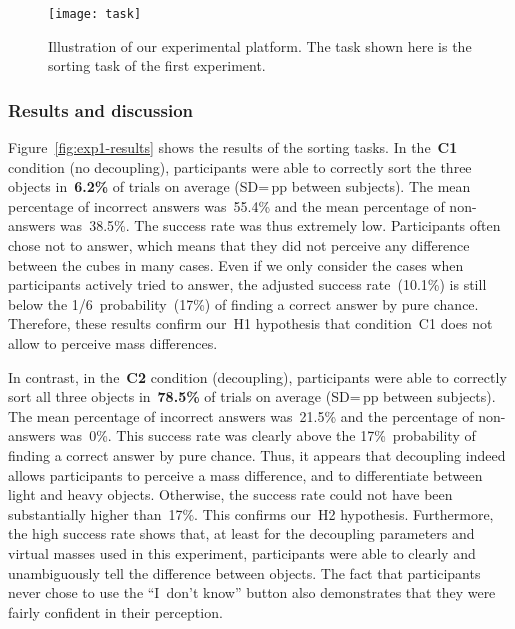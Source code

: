 \documentclass{vgtc}
\begin{document}
\begin{figure}[t]
  \centering
  \texttt{[image: task]}
  \vspace{-1.4mm}
  \caption{Illustration of our experimental platform. The task shown here is the sorting task of the first experiment.}
  \label{fig:exp1-task}
  \vspace{-4.5mm}
\end{figure}

\subsubsection{Results and discussion}

Figure~\ref{fig:exp1-results} shows the results of the sorting tasks. In the~\textbf{C1} condition (no decoupling), participants were able to correctly sort the three objects in~\textbf{6.2\%} of trials on average (SD\;=\,pp between subjects). The mean percentage of incorrect answers was~55.4\% and the mean percentage of non-answers was~38.5\%. The success rate was thus extremely low. Participants often chose not to answer, which means that they did not perceive any difference between the cubes in many cases. Even if we only consider the cases when participants actively tried to answer, the adjusted success rate~(10.1\%) is still below the 1/6~probability~(17\%) of finding a correct answer by pure chance. Therefore, these results confirm our~H1 hypothesis that condition~C1 does not allow to perceive mass differences.

In contrast, in the~\textbf{C2} condition (decoupling), participants were able to correctly sort all three objects in~\textbf{78.5\%} of trials on average (SD\;=\,pp between subjects). The mean percentage of incorrect answers was~21.5\% and the percentage of non-answers was~0\%. This success rate was clearly above the 17\%~probability of finding a \mbox{correct} answer by pure chance. Thus, it appears that decoupling indeed allows participants to perceive a mass difference, and to differentiate between light and heavy objects. Otherwise, the success rate could not have been substantially higher than~17\%. This confirms our~H2 hypothesis. Furthermore, the high success rate shows that, at least for the decoupling parameters and virtual masses used in this experiment, participants were able to clearly and unambiguously tell the difference between objects. The fact that participants never chose to use the ``I~don't know'' button also demonstrates that they were fairly confident in their perception.
\end{document}
